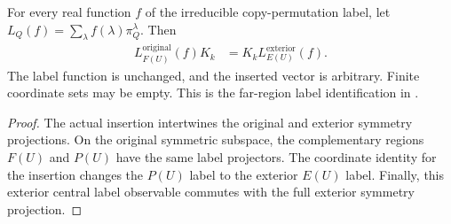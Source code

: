 \begin{theorem}
    \label{thm:bell_far_label_on_symmetric_range}
    \leanok
    For every real function $f$ of the irreducible copy-permutation label,
    let $L_Q(f)=\sum_\lambda f(\lambda)\pi_Q^\lambda$. Then
    \begin{align*}
        L_{F(U)}^{\mathrm{original}}(f)K_k
        &=K_k L_{E(U)}^{\mathrm{exterior}}(f).
    \end{align*}
    The label function is unchanged, and the inserted vector is arbitrary.
    Finite coordinate sets may be empty. This is the far-region label identification in
    \cite[\texttt{07-comparators.tex}, lines 299--308,
    \texttt{comparator:pinned-metric}]{OpenAI2026AreaLaw}.
\end{theorem}
\begin{proof}\leanok
    The actual insertion intertwines the original and exterior symmetry
    projections. On the original symmetric subspace, the complementary
    regions $F(U)$ and $P(U)$ have the same label projectors.
    The coordinate identity for the insertion changes the $P(U)$ label
    to the exterior $E(U)$ label. Finally, this exterior central label
    observable commutes with the full exterior symmetry projection.
\end{proof}

